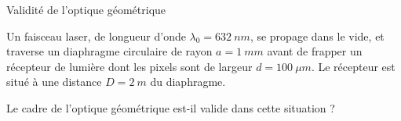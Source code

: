 \documentclass[12pt,fancy]{cours}
\begin{document}
 \begin{exemple}{Validité de l'optique géométrique}
  
  Un faisceau laser, de longueur d'onde  $\lambda_0=\SI{632}{nm}$, se propage dans le vide, et traverse un diaphragme circulaire de rayon $a=\SI{1}{mm}$ avant de  frapper un récepteur de lumière dont les pixels sont de largeur $d=\SI{100}{\mu m}$. Le récepteur est situé à une distance $D=\SI{2}{m}$ du diaphragme. 
  
  Le cadre de l'optique géométrique est-il valide dans cette situation ?
 \end{exemple}




%
\end{document}
